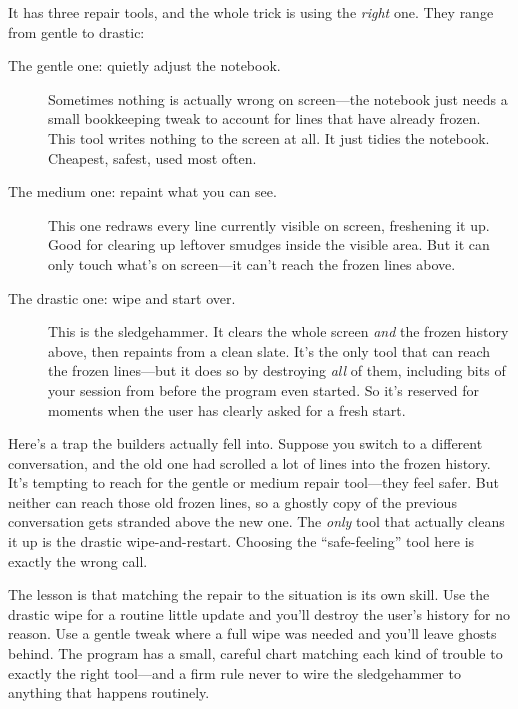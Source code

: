 \documentclass[11pt,twoside]{book}
\begin{document}
It has three repair tools, and the whole trick is using the \emph{right} one.
They range from gentle to drastic:

\begin{description}
\item[The gentle one: quietly adjust the notebook.] Sometimes nothing is
  actually wrong on screen---the notebook just needs a small bookkeeping
  tweak to account for lines that have already frozen. This tool writes
  nothing to the screen at all. It just tidies the notebook. Cheapest, safest,
  used most often.
\item[The medium one: repaint what you can see.] This one redraws every line
  currently visible on screen, freshening it up. Good for clearing up leftover
  smudges inside the visible area. But it can only touch what's on screen---it
  can't reach the frozen lines above.
\item[The drastic one: wipe and start over.] This is the sledgehammer. It
  clears the whole screen \emph{and} the frozen history above, then repaints
  from a clean slate. It's the only tool that can reach the frozen lines---but
  it does so by destroying \emph{all} of them, including bits of your session
  from before the program even started. So it's reserved for moments when the
  user has clearly asked for a fresh start.
\end{description}

\begin{trap}
Here's a trap the builders actually fell into. Suppose you switch to a
different conversation, and the old one had scrolled a lot of lines into the
frozen history. It's tempting to reach for the gentle or medium repair
tool---they feel safer. But neither can reach those old frozen lines, so a
ghostly copy of the previous conversation gets stranded above the new one. The
\emph{only} tool that actually cleans it up is the drastic wipe-and-restart.
Choosing the ``safe-feeling'' tool here is exactly the wrong call.
\end{trap}

The lesson is that matching the repair to the situation is its own skill. Use
the drastic wipe for a routine little update and you'll destroy the user's
history for no reason. Use a gentle tweak where a full wipe was needed and
you'll leave ghosts behind. The program has a small, careful chart matching
each kind of trouble to exactly the right tool---and a firm rule never to wire
the sledgehammer to anything that happens routinely.
\end{document}
